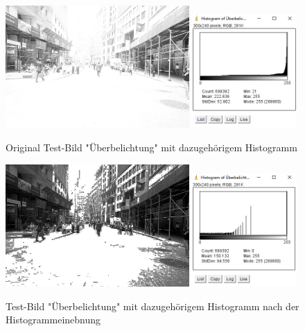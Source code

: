 \documentclass[12pt,german]{article}
\begin{document}
\begin{figure}[H] \centering
	\includegraphics[width=7cm]{../testData/Results/Ueberbelichtung/Ueberbelichtung.jpg}
	\includegraphics[width=4cm]{../testData/Results/Ueberbelichtung/Ueberbelichtung-histogram.png}
	\caption{Original Test-Bild "Überbelichtung" mit dazugehörigem Histogramm}
	\label{fig:Ueberbelichtung01}
\end{figure}
\begin{figure}[H] \centering
	\includegraphics[width=7cm]{../testData/Results/Ueberbelichtung/Ueberbelichtung-equalized.jpg}
	\includegraphics[width=4cm]{../testData/Results/Ueberbelichtung/Ueberbelichtung-equalized-histogram.png}
	\caption{Test-Bild "Überbelichtung" mit dazugehörigem Histogramm nach der Histogrammeinebnung}
	\label{fig:Ueberbelichtung02}
\end{figure}
\pagebreak
\end{document}
